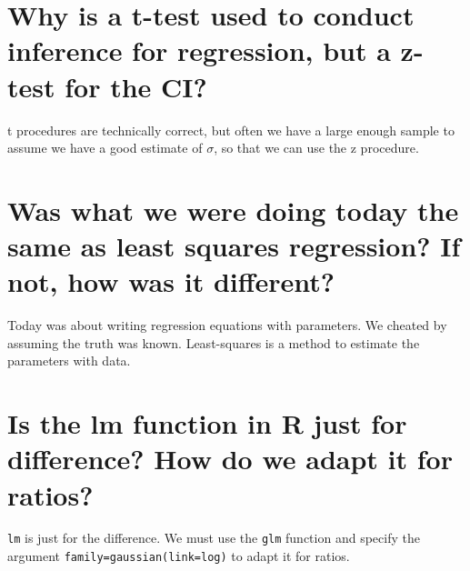 \documentclass[landscape,twocolumn,letterpaper,9pt,reqno]{article}
\begin{document}
\section{Why is a t-test used to conduct inference for regression, but a z-test for the CI?}

t procedures are technically correct, but often we have a large enough sample to assume we have a good estimate of $\sigma$, so that we can use the z procedure. 


\section{Was what we were doing today the same as least squares regression? If not, how was it different?}

Today was about writing regression equations with parameters. We cheated by assuming the truth was known. Least-squares is a method to estimate the parameters with data. 

\section{Is the lm function in R just for difference? How do we adapt it for ratios?}

\texttt{lm} is just for the difference. We must use the \texttt{glm} function and specify the argument \texttt{family=gaussian(link=log)} to adapt it for ratios. 
	
\end{document}
